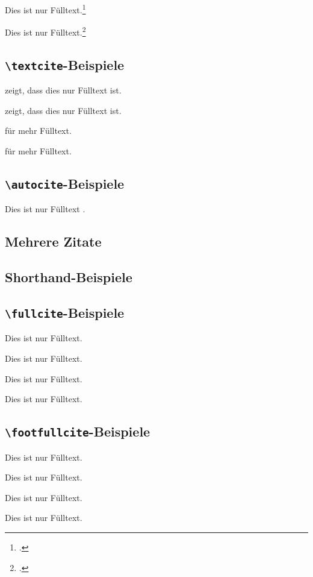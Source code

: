 \documentclass[a4paper]{article}
\newcommand{\cmd}[1]{\texttt{\textbackslash #1}}
\begin{document}
Dies ist nur Fülltext.\footcite[Siehe][]{springer}

Dies ist nur Fülltext.\footcite[Siehe][92--95]{springer}

\subsection*{\cmd{textcite}-Beispiele}

\textcite{aristotle:rhetoric} zeigt, dass dies nur Fülltext ist.

\textcite[59]{aristotle:rhetoric} zeigt, dass dies nur Fülltext ist.

\textcite[Siehe][]{springer} für mehr Fülltext.

\textcite[Siehe][92--95]{springer} für mehr Fülltext.

\subsection*{\cmd{autocite}-Beispiele}

Dies ist nur Fülltext \autocite{springer}.

\subsection*{Mehrere Zitate}

\cite{aristotle:rhetoric,aristotle:physics,aristotle:poetics}

\subsection*{Shorthand-Beispiele}

\cite{kant:kpv}

\cite[noch einmal]{kant:kpv}

\cite{kant:ku}

\subsection*{\cmd{fullcite}-Beispiele}

Dies ist nur Fülltext. 

Dies ist nur Fülltext. 

Dies ist nur Fülltext. 

Dies ist nur Fülltext. 

\subsection*{\cmd{footfullcite}-Beispiele}

Dies ist nur Fülltext. 

Dies ist nur Fülltext. 

Dies ist nur Fülltext. 

Dies ist nur Fülltext. 

\clearpage

\printshorthands

\nocite{*}
\printbibliography[notkeyword=journalnumberdate]
\end{document}
